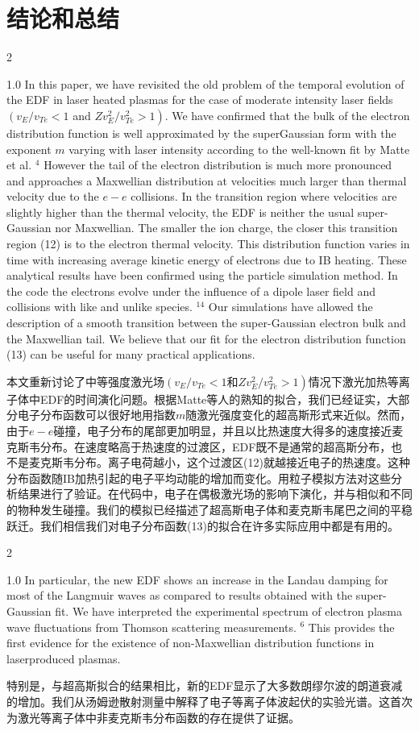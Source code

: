 \documentclass[oneside,onecolumn]{article}
\newcommand\enzhbox[2]{
	\quad\par \begin{paracol}{2} 
			\begin{spacing}{1.0}
					\footnotesize  #1
			\end{spacing}
			
		\switchcolumn[1] 
		#2
	\end{paracol} 
}
\begin{document}
\begin{sloppypar}
\section{结论和总结}
\enzhbox{ In this paper, we have revisited the old problem of the temporal evolution of the EDF in laser heated plasmas for the case of moderate intensity laser fields $\left(v_{E} / v_{T e}<1\right.$ and $\left.Z v_{E}^{2} / v_{T e}^{2}>1\right)$. We have confirmed that the bulk of the electron distribution function is well approximated by the superGaussian form with the exponent $m$ varying with laser intensity according to the well-known fit by Matte et al. ${ }^{4}$ However the tail of the electron distribution is much more pronounced and approaches a Maxwellian distribution at velocities much larger than thermal velocity due to the $e-e$ collisions. In the transition region where velocities are slightly higher than the thermal velocity, the EDF is neither the usual super-Gaussian nor Maxwellian. The smaller the ion charge, the closer this transition region (12) is to the electron thermal velocity. This distribution function varies in time with increasing average kinetic energy of electrons due to IB heating. These analytical results have been confirmed using the particle simulation method. In the code the electrons evolve under the influence of a dipole laser field and collisions with like and unlike species. ${ }^{14}$ Our simulations have allowed the description of a smooth transition between the super-Gaussian electron bulk and the Maxwellian tail. We believe that our fit for the electron distribution function (13) can be useful for many practical applications.
}{ 
本文重新讨论了中等强度激光场$\left(v_{E} / v_{T e}<1\right.$和$\left.Z v_{E}^{2} / v_{T e}^{2}>1\right)$情况下激光加热等离子体中EDF的时间演化问题。根据Matte等人的熟知的拟合，我们已经证实，大部分电子分布函数可以很好地用指数$m$随激光强度变化的超高斯形式来近似。然而，由于$e-e$碰撞，电子分布的尾部更加明显，并且以比热速度大得多的速度接近麦克斯韦分布。在速度略高于热速度的过渡区，EDF既不是通常的超高斯分布，也不是麦克斯韦分布。离子电荷越小，这个过渡区(12)就越接近电子的热速度。这种分布函数随IB加热引起的电子平均动能的增加而变化。用粒子模拟方法对这些分析结果进行了验证。在代码中，电子在偶极激光场的影响下演化，并与相似和不同的物种发生碰撞。我们的模拟已经描述了超高斯电子体和麦克斯韦尾巴之间的平稳跃迁。我们相信我们对电子分布函数(13)的拟合在许多实际应用中都是有用的。
}
  

\enzhbox{  In particular, the new EDF shows an increase in the Landau damping for most of the Langmuir waves as compared to results obtained with the super-Gaussian fit. We have interpreted the experimental spectrum of electron plasma wave fluctuations from Thomson scattering measurements. $^{6}$ This provides the first evidence for the existence of non-Maxwellian distribution functions in laserproduced plasmas.
}{
特别是，与超高斯拟合的结果相比，新的EDF显示了大多数朗缪尔波的朗道衰减的增加。我们从汤姆逊散射测量中解释了电子等离子体波起伏的实验光谱。这首次为激光等离子体中非麦克斯韦分布函数的存在提供了证据。
}
  \clearpage
 

\end{sloppypar}
\end{document}
